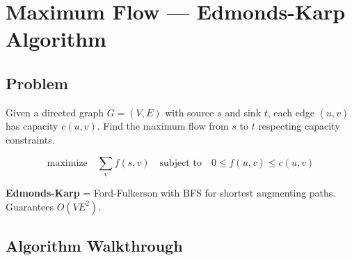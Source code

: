 \section{Maximum Flow --- Edmonds-Karp Algorithm}

\subsection{Problem}

Given a directed graph $G = (V, E)$ with source $s$ and sink $t$, each edge $(u,v)$ has capacity $c(u,v)$. Find the maximum flow from $s$ to $t$ respecting capacity constraints.

$$\text{maximize} \quad \sum_{v} f(s,v) \quad \text{subject to} \quad 0 \le f(u,v) \le c(u,v)$$

\textbf{Edmonds-Karp} = Ford-Fulkerson with BFS for shortest augmenting paths. Guarantees $O(VE^2)$.

\subsection{Algorithm Walkthrough}

